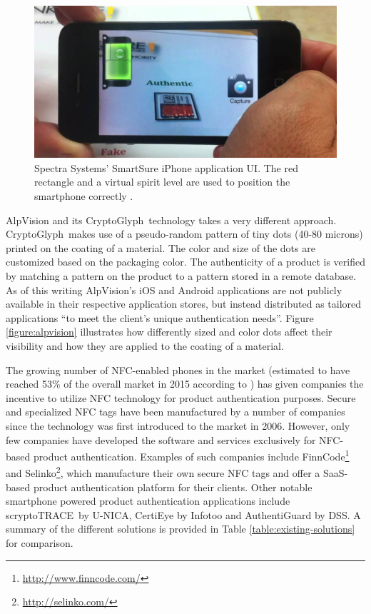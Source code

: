 \documentclass[thesis.tex]{subfiles}
\begin{document}
\begin{figure}[ht]
\centering \includegraphics[width=13.25cm]{images/existing_solutions/smartsure}
\caption{Spectra Systems' SmartSure iPhone application UI. The red rectangle and a virtual spirit level are used to position the smartphone correctly \cite{inksure}. \label{figure:inksure}}
\end{figure}

AlpVision and its CryptoGlyph\textregistered\ technology takes a very different approach. CryptoGlyph\textregistered\ makes use of a pseudo-random pattern of tiny dots (40-80 microns) printed on the coating of a material. The color and size of the dots are customized based on the packaging color. The authenticity of a product is verified by matching a pattern on the product to a pattern stored in a remote database. As of this writing AlpVision's iOS and Android applications are not publicly available in their respective application stores, but instead distributed as tailored applications ``to meet the client's unique authentication needs''. Figure \ref{figure:alpvision} illustrates how differently sized and color dots affect their visibility and how they are applied to the coating of a material. \cite{alpvision}

The growing number of NFC-enabled phones in the market (estimated to have reached 53\% of the overall market in 2015 according to \cite{frost-sullivan}) has given companies the incentive to utilize NFC technology for product authentication purposes. Secure and specialized NFC tags have been manufactured by a number of companies since the technology was first introduced to the market in 2006. However, only few companies have developed the software and services exclusively for NFC-based product authentication. Examples of such companies include FinnCode\footnote{\url{http://www.finncode.com/}} and Selinko\footnote{\url{http://selinko.com/}}, which manufacture their own secure NFC tags and offer a SaaS-based product authentication platform for their clients. Other notable smartphone powered product authentication applications include scryptoTRACE\textregistered\ by U-NICA, CertiEye by Infotoo and AuthentiGuard by DSS. A summary of the different solutions is provided in Table \ref{table:existing-solutions} for comparison.
\end{document}
